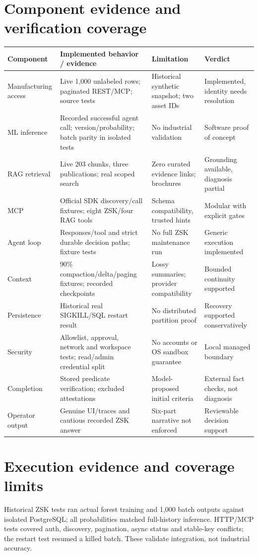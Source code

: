 \section{Component evidence and verification coverage}
\par\smallskip\noindent\begin{tabularx}{\linewidth}{@{}p{.18\linewidth}p{.27\linewidth}XX@{}}\toprule
Component & Implemented behavior / evidence & Limitation & Verdict\\\midrule
Manufacturing access & Live 1,000 unlabeled rows; paginated REST/MCP; source tests & Historical synthetic snapshot; two asset IDs & Implemented, identity needs resolution\\
ML inference & Recorded successful agent call; version/probability; batch parity in isolated tests & No industrial validation & Software proof of concept\\
RAG retrieval & Live 203 chunks, three publications; real scoped search & Zero curated evidence links; brochures & Grounding available, diagnosis partial\\
MCP & Official SDK discovery/call fixtures; eight ZSK/four RAG tools & Schema compatibility, trusted hints & Modular with explicit gates\\
Agent loop & Responses/tool and strict durable decision paths; fixture tests & No full ZSK maintenance run & Generic execution implemented\\
Context & 90\% compaction/delta/paging fixtures; recorded checkpoints & Lossy summaries; provider compatibility & Bounded continuity supported\\
Persistence & Historical real SIGKILL/SQL restart result & No distributed partition proof & Recovery supported conservatively\\
Security & Allowlist, approval, network and workspace tests; read/admin credential split & No accounts or OS sandbox guarantee & Local managed boundary\\
Completion & Stored predicate verification; excluded attestations & Model-proposed initial criteria & External fact checks, not diagnosis\\
Operator output & Genuine UI/traces and cautious recorded ZSK answer & Six-part narrative not enforced & Reviewable decision support\\\bottomrule
\end{tabularx}\par\smallskip
\section{Execution evidence and coverage limits}
Historical ZSK tests ran actual forest training and 1,000 batch outputs against isolated PostgreSQL; all probabilities matched full-history inference. HTTP/MCP tests covered auth, discovery, pagination, async status and stable-key conflicts; the restart test resumed a killed batch. These validate integration, not industrial accuracy.

